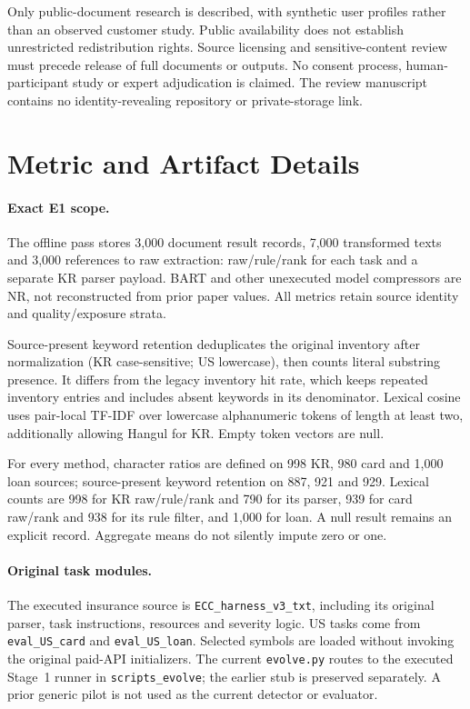 \documentclass[11pt]{article}
\begin{document}
Only public-document research is described, with synthetic user profiles
rather than an observed customer study. Public availability does not
establish unrestricted redistribution rights. Source licensing and
sensitive-content review must precede release of full documents or
outputs. No consent process, human-participant study or expert
adjudication is claimed. The review manuscript contains no
identity-revealing repository or private-storage link.


\clearpage
\appendix

\section{Metric and Artifact Details}
\label{sec:implementation}
\paragraph{Exact E1 scope.}
The offline pass stores 3,000 document result records, 7,000 transformed
texts and 3,000 references to raw extraction: raw/rule/rank for each task
and a separate KR parser payload. BART and other unexecuted model
compressors are NR, not reconstructed from prior paper values.
All metrics retain source identity and quality/exposure strata.

Source-present keyword retention deduplicates the original inventory
after normalization (KR case-sensitive; US lowercase), then counts
literal substring presence. It differs from the legacy inventory
hit rate, which keeps repeated inventory entries and includes absent
keywords in its denominator. Lexical cosine uses pair-local TF-IDF
over lowercase alphanumeric tokens of length at least two, additionally
allowing Hangul for KR. Empty token vectors are null.

For every method, character ratios are defined on 998 KR, 980 card and
1,000 loan sources; source-present keyword retention on 887, 921 and 929.
Lexical counts are 998 for KR raw/rule/rank and 790 for its parser,
939 for card raw/rank and 938 for its rule filter, and 1,000 for loan.
A null result remains an explicit record. Aggregate means do not
silently impute zero or one.

\paragraph{Original task modules.}
The executed insurance source is \texttt{ECC\_harness\_v3\_txt}, including
its original parser, task instructions, resources and severity logic.
US tasks come from \texttt{eval\_US\_card} and \texttt{eval\_US\_loan}.
Selected symbols are loaded without invoking the original paid-API
initializers. The current \texttt{evolve.py} routes to the executed
Stage~1 runner in \texttt{scripts\_evolve}; the earlier stub is preserved
separately. A prior generic pilot is not used as the current detector
or evaluator.
\end{document}
